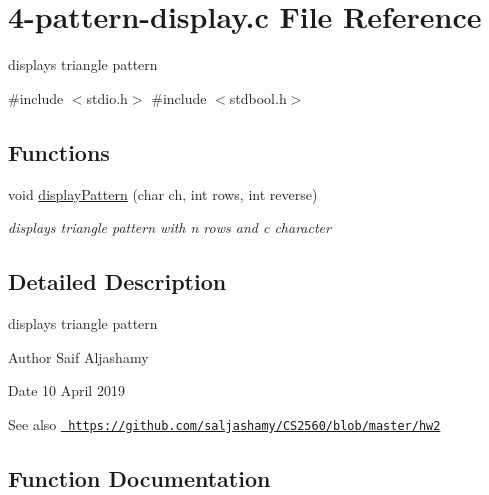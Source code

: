 \hypertarget{4-pattern-display_8c}{}\section{4-\/pattern-\/display.c File Reference}
\label{4-pattern-display_8c}


displays triangle pattern  


{\ttfamily \#include $<$stdio.\+h$>$}\newline
{\ttfamily \#include $<$stdbool.\+h$>$}\newline
\subsection*{Functions}
\begin{DoxyCompactItemize}
\item 
void \mbox{\hyperlink{4-pattern-display_8c_a0e7ede639bd3442612e9f23e40b798ea}{display\+Pattern}} (char ch, int rows, int reverse)
\begin{DoxyCompactList}\small\item\em displays triangle pattern with n rows and c character \end{DoxyCompactList}\end{DoxyCompactItemize}


\subsection{Detailed Description}
displays triangle pattern 

\begin{DoxyAuthor}{Author}
Saif Aljashamy 
\end{DoxyAuthor}
\begin{DoxyDate}{Date}
10 April 2019 
\end{DoxyDate}
\begin{DoxySeeAlso}{See also}
\href{https://github.com/saljashamy/CS2560/blob/master/hw2}{\texttt{ https\+://github.\+com/saljashamy/\+C\+S2560/blob/master/hw2}} 
\end{DoxySeeAlso}


\subsection{Function Documentation}
\mbox{\label{4-pattern-display_8c_a0e7ede639bd3442612e9f23e40b798ea}} 

